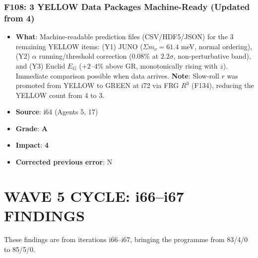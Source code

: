 \documentclass[11pt,a4paper]{article}
\newcommand{\grade}[1]{\textbf{#1}}
\newcommand{\impact}[1]{\textbf{#1}}
\begin{document}
\section{F108: 3 YELLOW Data Packages Machine-Ready (Updated from 4)}
\begin{itemize}[nosep]
\item \textbf{What}: Machine-readable prediction files (CSV/HDF5/JSON) for the 3 remaining YELLOW items: (Y1) JUNO ($\Sigma m_\nu = 61.4$ meV, normal ordering), (Y2) $\alpha$ running/threshold correction ($0.08\%$ at $2.2\sigma$, non-perturbative band), and (Y3) Euclid $E_G$ ($+2$--$4\%$ above GR, monotonically rising with $z$). Immediate comparison possible when data arrives. \textbf{Note}: Slow-roll $r$ was promoted from YELLOW to GREEN at i72 via FRG $R^3$ (F134), reducing the YELLOW count from 4 to 3.
\item \textbf{Source}: i64 (Agents 5, 17)
\item \textbf{Grade}: \grade{A}
\item \textbf{Impact}: \impact{4}
\item \textbf{Corrected previous error}: N
\end{itemize}


\part{WAVE 5 CYCLE: i66--i67 FINDINGS}
\label{part:wave5i66i67}

These findings are from iterations i66--i67, bringing the programme from 83/4/0 to 85/5/0.

\end{document}
